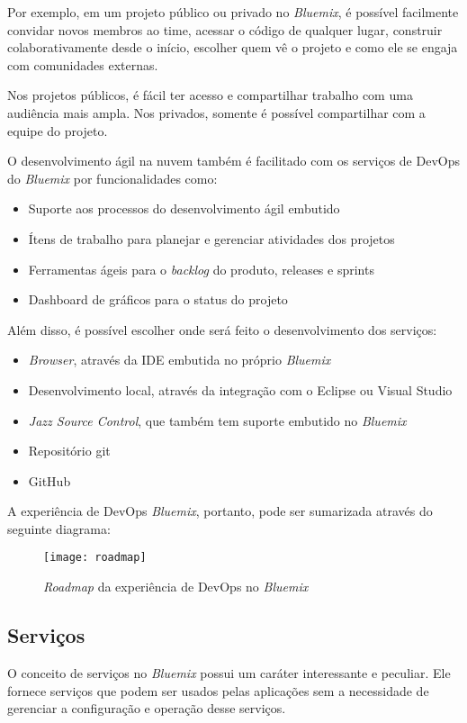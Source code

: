 Por exemplo, em um projeto público ou privado no \textit{Bluemix}, é possível facilmente convidar novos membros ao time, acessar o código de qualquer lugar, construir colaborativamente desde o início, escolher quem vê o projeto e como ele se engaja com comunidades externas.

Nos projetos públicos, é fácil ter acesso e compartilhar trabalho com uma audiência mais ampla. Nos privados, somente é possível compartilhar com a equipe do projeto.

O desenvolvimento ágil na nuvem também é facilitado com os serviços de DevOps do \textit{Bluemix} por funcionalidades como:
\begin{itemize}
    \item Suporte aos processos do desenvolvimento ágil embutido
    \item Ítens de trabalho para planejar e gerenciar atividades dos projetos
    \item Ferramentas ágeis para o \textit{backlog} do produto, releases e sprints
    \item Dashboard de gráficos para o status do projeto
\end{itemize}

Além disso, é possível escolher onde será feito o desenvolvimento dos serviços:
\begin{itemize}
  \item \textit{Browser}, através da IDE embutida no próprio \textit{Bluemix}
  \item Desenvolvimento local, através da integração com o Eclipse ou Visual Studio
  \item \textit{Jazz Source Control}, que também tem suporte embutido no \textit{Bluemix}
  \item Repositório git
  \item GitHub
\end{itemize}
A experiência de DevOps \textit{Bluemix}, portanto, pode ser sumarizada através do seguinte diagrama:
\begin{figure}[!htb]
    \centering
    \texttt{[image: roadmap]}
    \caption{\textit{Roadmap} da experiência de DevOps no \textit{Bluemix}}
    \label{Rotulo}
\end{figure}

\subsection{Serviços}

O conceito de serviços no \textit{Bluemix} possui um caráter interessante e peculiar. Ele fornece serviços que podem ser usados pelas aplicações sem a necessidade de gerenciar a configuração e operação desse serviços.

